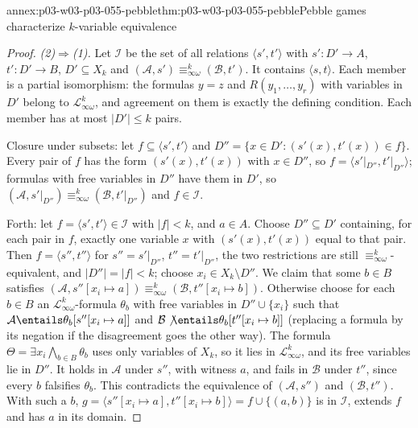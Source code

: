 \begin{annexitem}{annex:p03-w03-p03-055-pebble}{thm:p03-w03-p03-055-pebble}{Pebble games characterize \(k\)-variable equivalence}
\begin{proof}
\emph{(2)\(\Rightarrow\)(1).} Let \(\mathcal I\) be the set of all relations
\(\langle s',t'\rangle\) with \(s'\colon D'\to A\), \(t'\colon D'\to B\),
\(D'\subseteq X_k\) and \((\mathcal A,s')\equiv^k_{\infty\omega}(\mathcal B,t')\).
It contains \(\langle s,t\rangle\). Each member is a partial
isomorphism: the formulas \(y=z\) and \(R(y_1,\ldots,y_r)\) with variables
in \(D'\) belong to \(\mathcal L^k_{\infty\omega}\), and agreement on them
is exactly the defining condition. Each member has at most
\(|D'|\le k\) pairs.

Closure under subsets: let \(f\subseteq\langle s',t'\rangle\) and
\(D''=\{x\in D':(s'(x),t'(x))\in f\}\). Every pair of \(f\) has the form
\((s'(x),t'(x))\) with \(x\in D''\), so
\(f=\langle s'|_{D''},t'|_{D''}\rangle\); formulas with free variables in
\(D''\) have them in \(D'\), so
\((\mathcal A,s'|_{D''})\equiv^k_{\infty\omega}(\mathcal B,t'|_{D''})\) and
\(f\in\mathcal I\).

Forth: let \(f=\langle s',t'\rangle\in\mathcal I\) with \(|f|<k\), and
\(a\in A\). Choose \(D''\subseteq D'\) containing, for each pair in \(f\),
exactly one variable \(x\) with \((s'(x),t'(x))\) equal to that pair. Then
\(f=\langle s'',t''\rangle\) for \(s''=s'|_{D''}\), \(t''=t'|_{D''}\), the
two restrictions are still \(\equiv^k_{\infty\omega}\)-equivalent, and
\(|D''|=|f|<k\); choose \(x_i\in X_k\setminus D''\). We claim that some
\(b\in B\) satisfies
\((\mathcal A,s''[x_i\mapsto a])\equiv^k_{\infty\omega}(\mathcal B,t''[x_i\mapsto b])\).
Otherwise choose for each \(b\in B\) an
\(\mathcal L^k_{\infty\omega}\)-formula \(\theta_b\) with free variables in
\(D''\cup\{x_i\}\) such that \(\mathcal A\entails\theta_b[s''[x_i\mapsto a]]\)
and \(\mathcal B\not\entails\theta_b[t''[x_i\mapsto b]]\) (replacing a
formula by its negation if the disagreement goes the other way). The formula
\(\Theta=\exists x_i\bigwedge_{b\in B}\theta_b\) uses only variables of
\(X_k\), so it lies in \(\mathcal L^k_{\infty\omega}\), and its free
variables lie in \(D''\). It holds in \(\mathcal A\) under \(s''\), with
witness \(a\), and fails in \(\mathcal B\) under \(t''\), since every
\(b\) falsifies \(\theta_b\). This contradicts the equivalence of
\((\mathcal A,s'')\) and \((\mathcal B,t'')\). With such a \(b\),
\(g=\langle s''[x_i\mapsto a],t''[x_i\mapsto b]\rangle=f\cup\{(a,b)\}\) is
in \(\mathcal I\), extends \(f\) and has \(a\) in its domain.


\end{proof}
\end{annexitem}
